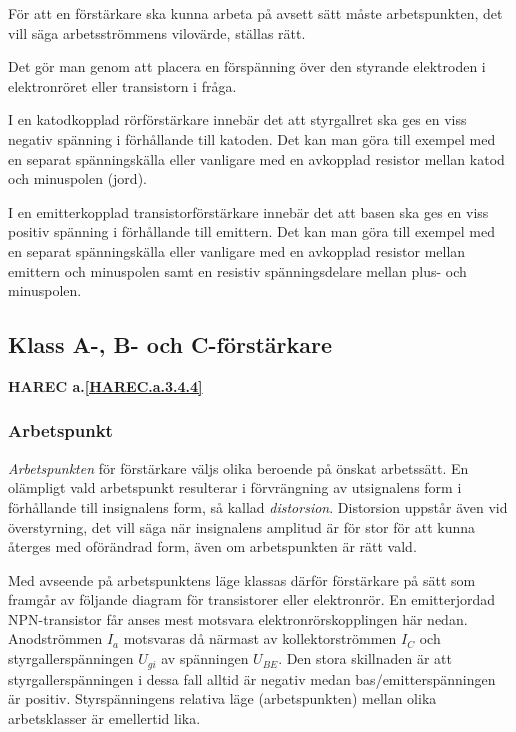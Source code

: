 För att en förstärkare ska kunna arbeta på avsett sätt måste
arbetspunkten, det vill säga arbetsströmmens vilovärde, ställas rätt.

Det gör man genom att placera en förspänning över den styrande
elektroden i elektronröret eller transistorn i fråga.

I en katodkopplad rörförstärkare innebär det att styrgallret ska
ges en viss negativ spänning i förhållande till katoden.
Det kan man göra till exempel med en separat spänningskälla eller vanligare med
en avkopplad resistor mellan katod och minuspolen (jord).

I en emitterkopplad transistorförstärkare innebär det att basen ska
ges en viss positiv spänning i förhållande till emittern.
Det kan man göra till exempel med en separat spänningskälla eller vanligare med
en avkopplad resistor mellan emittern och minuspolen samt en resistiv
spänningsdelare mellan plus- och minuspolen.

\subsection{Klass A-, B- och C-förstärkare}
\textbf{HAREC a.\ref{HAREC.a.3.4.4}\label{myHAREC.a.3.4.4}}

\subsubsection{Arbetspunkt}

\emph{Arbetspunkten} för förstärkare väljs olika beroende på önskat arbetssätt.
En olämpligt vald arbetspunkt resulterar i förvrängning av utsignalens form i
förhållande till insignalens form, så kallad \emph{distorsion}.
Distorsion uppstår även vid överstyrning, det vill säga när insignalens
amplitud är för stor för att kunna återges med oförändrad form, även om
arbetspunkten är rätt vald.

Med avseende på arbetspunktens läge klassas därför förstärkare på sätt
som framgår av följande diagram för transistorer eller elektronrör.
En emitterjordad NPN-transistor får anses mest motsvara
elektronrörskopplingen här nedan.
Anodströmmen \(I_a\) motsvaras då närmast av kollektorströmmen
\(I_C\) och styrgallerspänningen \(U_{gi}\) av spänningen
\(U_{BE}\).
Den stora skillnaden är att styrgallerspänningen i dessa
fall alltid är negativ medan bas/emitterspänningen är positiv.
Styrspänningens relativa läge (arbetspunkten) mellan olika
arbetsklasser är emellertid lika.

